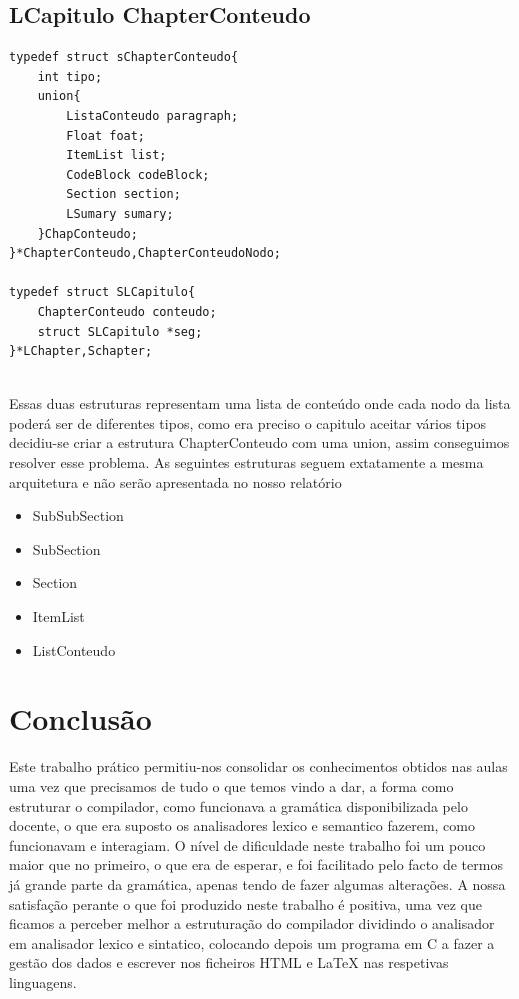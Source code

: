 \documentclass[12pt,a4paper]{report}
\begin{document}
\section{LCapitulo ChapterConteudo }
\begin{verbatim}
typedef struct sChapterConteudo{
    int tipo;
    union{
        ListaConteudo paragraph;
        Float foat;
        ItemList list;
        CodeBlock codeBlock;
        Section section;
        LSumary sumary;
    }ChapConteudo;
}*ChapterConteudo,ChapterConteudoNodo;

typedef struct SLCapitulo{
    ChapterConteudo conteudo;
    struct SLCapitulo *seg;
}*LChapter,Schapter; 
 
\end{verbatim}Essas duas estruturas representam uma lista de conteúdo onde cada nodo da lista poderá ser de diferentes tipos, como era preciso o capitulo aceitar vários tipos decidiu-se criar a estrutura ChapterConteudo com uma union, assim conseguimos resolver esse problema.       
As seguintes estruturas seguem extatamente a mesma arquitetura e não serão apresentada no nosso relatório
\begin{itemize}\item SubSubSection  \item SubSection  \item Section \item ItemList  \item ListConteudo  \end{itemize}\chapter{Conclusão}
Este trabalho prático permitiu-nos consolidar os conhecimentos obtidos nas aulas uma vez que precisamos de tudo o que temos vindo a dar, a forma como estruturar o compilador, como funcionava a gramática disponibilizada pelo docente, o que era suposto os analisadores lexico e semantico fazerem, como funcionavam e interagiam. O nível de dificuldade neste trabalho foi um pouco maior que no primeiro, o que era de esperar, e foi facilitado pelo facto de termos já grande parte da gramática, apenas tendo de fazer algumas alterações. A nossa satisfação perante o que foi produzido neste trabalho é positiva, uma vez que ficamos a perceber melhor a estruturação do compilador dividindo o analisador em analisador lexico e sintatico, colocando depois um programa em C a fazer a gestão dos dados e escrever nos ficheiros HTML e LaTeX nas respetivas linguagens. 
 
\end{document}
